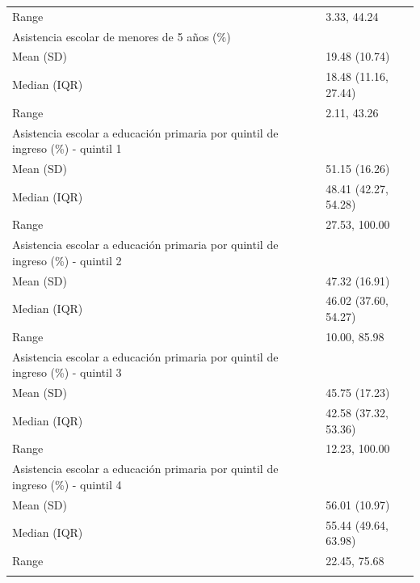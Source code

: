 \begin{table}
\begin{tabular}{ll}
\hspace{1em}Range & 3.33, 44.24\\
\addlinespace
Asistencia escolar de menores de 5 años (\%) & \\
\hspace{1em}Mean (SD) & 19.48 (10.74)\\
\hspace{1em}Median (IQR) & 18.48 (11.16, 27.44)\\
\hspace{1em}Range & 2.11, 43.26\\
Asistencia escolar a educación primaria por quintil de ingreso (\%) - quintil 1 & \\
\addlinespace
\hspace{1em}Mean (SD) & 51.15 (16.26)\\
\hspace{1em}Median (IQR) & 48.41 (42.27, 54.28)\\
\hspace{1em}Range & 27.53, 100.00\\
Asistencia escolar a educación primaria por quintil de ingreso (\%) - quintil 2 & \\
\hspace{1em}Mean (SD) & 47.32 (16.91)\\
\addlinespace
\hspace{1em}Median (IQR) & 46.02 (37.60, 54.27)\\
\hspace{1em}Range & 10.00, 85.98\\
Asistencia escolar a educación primaria por quintil de ingreso (\%) - quintil 3 & \\
\hspace{1em}Mean (SD) & 45.75 (17.23)\\
\hspace{1em}Median (IQR) & 42.58 (37.32, 53.36)\\
\addlinespace
\hspace{1em}Range & 12.23, 100.00\\
Asistencia escolar a educación primaria por quintil de ingreso (\%) - quintil 4 & \\
\hspace{1em}Mean (SD) & 56.01 (10.97)\\
\hspace{1em}Median (IQR) & 55.44 (49.64, 63.98)\\
\hspace{1em}Range & 22.45, 75.68\\
\addlinespace

\end{tabular}
\end{table}
